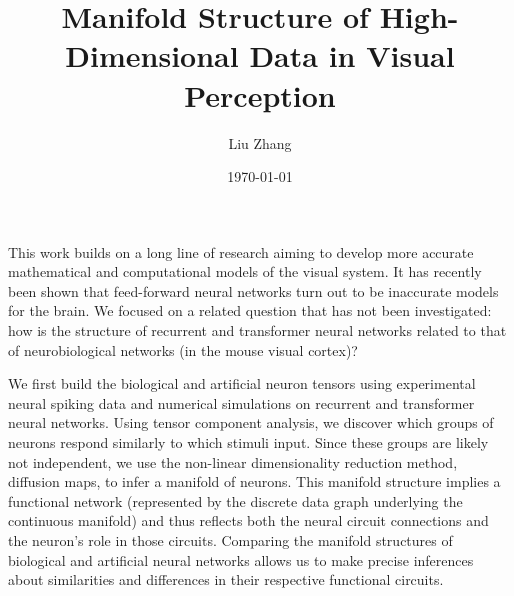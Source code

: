 \documentclass{article}
\title{Manifold Structure of High-Dimensional Data in Visual Perception}
\author{Liu Zhang}
\date{\today}
\begin{document}
\maketitle
This work builds on a long line of research aiming to develop more accurate mathematical and computational models of the visual system. It has recently been shown that feed-forward neural networks turn out to be inaccurate models for the brain. We focused on a related question that has not been investigated: how is the structure of recurrent and transformer neural networks related to that of neurobiological networks (in the mouse visual cortex)?

We first build the biological and artificial neuron tensors using experimental neural spiking data and numerical simulations on recurrent and transformer neural networks. Using tensor component analysis, we discover which groups of neurons respond similarly to which stimuli input. Since these groups are likely not independent, we use the non-linear dimensionality reduction method, diffusion maps, to infer a manifold of neurons. This manifold structure implies a functional network (represented by the discrete data graph underlying the continuous manifold) and thus reflects both the neural circuit connections and the neuron’s role in those circuits. Comparing the manifold structures of biological and artificial neural networks allows us to make precise inferences about similarities and differences in their respective functional circuits. 
\end{document}
